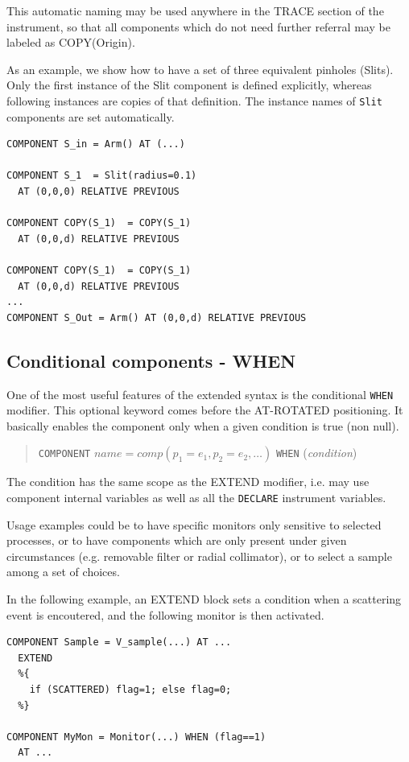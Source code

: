 This automatic naming may be used anywhere in the TRACE section of the instrument, so that all components which do not need further referral may be labeled as COPY(Origin).

As an example, we show how to have a set of three equivalent pinholes (Slits). Only the first instance of the Slit component is defined explicitly, whereas following instances are
copies of that definition. The instance names of \texttt{Slit} components are set automatically.

\begin{verbatim}
COMPONENT S_in = Arm() AT (...)

COMPONENT S_1  = Slit(radius=0.1)
  AT (0,0,0) RELATIVE PREVIOUS

COMPONENT COPY(S_1)  = COPY(S_1)
  AT (0,0,d) RELATIVE PREVIOUS

COMPONENT COPY(S_1)  = COPY(S_1)
  AT (0,0,d) RELATIVE PREVIOUS
...
COMPONENT S_Out = Arm() AT (0,0,d) RELATIVE PREVIOUS
\end{verbatim}

\subsection{Conditional components - WHEN}
\label{s:instrdefs-extend-when}

One of the most useful features of the extended \MCX syntax is the conditional \texttt{WHEN} modifier. This optional keyword comes before the AT-ROTATED positioning. It basically
enables the component only when a given condition is true (non null).

\begin{quote}
  \texttt{COMPONENT} $\textit{name} = \textit{comp}(p_1 = e_1, p_2 = e_2, \ldots)$
  \texttt{WHEN} (\textit{condition})
\end{quote}
The condition has the same scope as the EXTEND modifier, i.e. may use component internal variables as well as all the \texttt{DECLARE} instrument variables.

Usage examples could be to have specific monitors only sensitive to selected processes, or to have components which are only present under given circumstances (e.g. removable
filter or radial collimator), or to select a sample among a set of choices.

In the following example, an EXTEND block sets a condition when a scattering event is encoutered, and the following monitor is then activated.
\begin{verbatim}
COMPONENT Sample = V_sample(...) AT ...
  EXTEND
  %{
    if (SCATTERED) flag=1; else flag=0;
  %}

COMPONENT MyMon = Monitor(...) WHEN (flag==1)
  AT ...
\end{verbatim}

